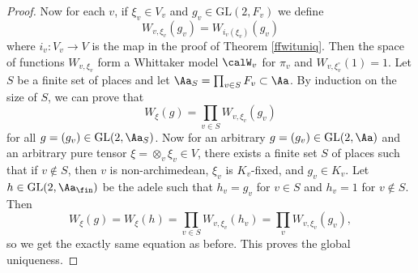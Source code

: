 \documentclass{article}
\newcommand{\GL}{\mathrm{GL}}
\begin{document}
\begin{proof}
Now for each $v$, if $\xi_v\in V_v$ and $g_v\in \GL(2, F_v)$ we define 
$$
W_{v, \xi_v}(g_v) = W_{i_v(\xi_v)}(g_v)
$$
where $i_v:V_v \to V$ is the map in the proof of Theorem \ref{ffwituniq}. 
Then the space of functions $W_{v, \xi_v}$ form a Whittaker model $\calW_v$ for $\pi_v$ and $W_{v, \xi_{v}^{\circ}}(1) = 1$. 
Let $S$ be a finite set of places and let $\Aa_{S} = \prod_{v\in S} F_{v} \subset \Aa$. By induction on the size of $S$, we can prove that 
$$
W_{\xi}(g) = \prod_{v\in S} W_{v, \xi_v}(g_v)
$$
for all $g = (g_v) \in \GL(2, \Aa_S)$. Now for an arbitrary $g = (g_v) \in \GL(2, \Aa)$ and an arbitrary pure tensor $\xi = \otimes_v \xi_v \in V$, there exists a finite set $S$ of places such that if $v\not\in S$, then $v$ is non-archimedean, $\xi_v$ is $K_v$-fixed,  and $g_v\in K_v$. 
Let $h \in \GL(2, \Aa_\fin)$ be the adele such that $h_v = g_v$ for $v\in S$ and $h_v = 1$ for $v\not\in S$. 
Then 
$$
W_{\xi}(g) = W_{\xi}(h) = \prod_{v\in S} W_{v, \xi_v}(h_v) = \prod_{v} W_{v, \xi_v}(g_v), 
$$
so we get the exactly same equation as before. This proves the global uniqueness. 
\end{proof}
\end{document}

